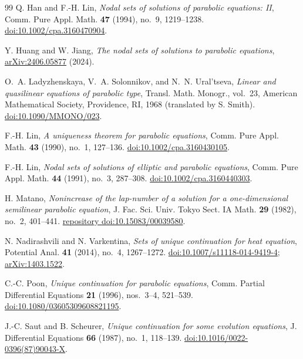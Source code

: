 \documentclass[11pt,reqno]{amsart}
\numberwithin{equation}{section}
\theoremstyle{definition}
\theoremstyle{remark}
\begin{document}
\begin{thebibliography}{99}
Q. Han and F.-H. Lin,
\emph{Nodal sets of solutions of parabolic equations: II},
Comm. Pure Appl. Math. \textbf{47} (1994), no.~9, 1219--1238.
\href{https://doi.org/10.1002/cpa.3160470904}{doi:10.1002/cpa.3160470904}.

Y. Huang and W. Jiang, \emph{The nodal sets of solutions to parabolic equations},
\href{https://arxiv.org/abs/2406.05877}{arXiv:2406.05877} (2024).

O.~A. Ladyzhenskaya, V.~A. Solonnikov, and N.~N. Ural'tseva,
\emph{Linear and quasilinear equations of parabolic type},
Transl. Math. Monogr., vol.~23, American Mathematical Society,
Providence, RI, 1968 (translated by S. Smith).
\href{https://doi.org/10.1090/MMONO/023}{doi:10.1090/MMONO/023}.

F.-H. Lin, \emph{A uniqueness theorem for parabolic equations},
Comm. Pure Appl. Math. \textbf{43} (1990), no.~1, 127--136.
\href{https://doi.org/10.1002/cpa.3160430105}{doi:10.1002/cpa.3160430105}.

F.-H. Lin, \emph{Nodal sets of solutions of elliptic and parabolic equations},
Comm. Pure Appl. Math. \textbf{44} (1991), no.~3, 287--308.
\href{https://doi.org/10.1002/cpa.3160440303}{doi:10.1002/cpa.3160440303}.

H. Matano, \emph{Nonincrease of the lap-number of a solution for a
one-dimensional semilinear parabolic equation},
J. Fac. Sci. Univ. Tokyo Sect. IA Math. \textbf{29} (1982), no.~2, 401--441.
\href{https://doi.org/10.15083/00039580}{repository doi:10.15083/00039580}.

N. Nadirashvili and N. Varkentina,
\emph{Sets of unique continuation for heat equation},
Potential Anal. \textbf{41} (2014), no.~4, 1267--1272.
\href{https://doi.org/10.1007/s11118-014-9419-4}{doi:10.1007/s11118-014-9419-4};
\href{https://arxiv.org/abs/1403.1522}{arXiv:1403.1522}.

C.-C. Poon, \emph{Unique continuation for parabolic equations},
Comm. Partial Differential Equations \textbf{21} (1996), nos.~3--4, 521--539.
\href{https://doi.org/10.1080/03605309608821195}{doi:10.1080/03605309608821195}.

J.-C. Saut and B. Scheurer, \emph{Unique continuation for some evolution equations},
J. Differential Equations \textbf{66} (1987), no.~1, 118--139.
\href{https://doi.org/10.1016/0022-0396(87)90043-X}{doi:10.1016/0022-0396(87)90043-X}.
\end{thebibliography}
\end{document}
